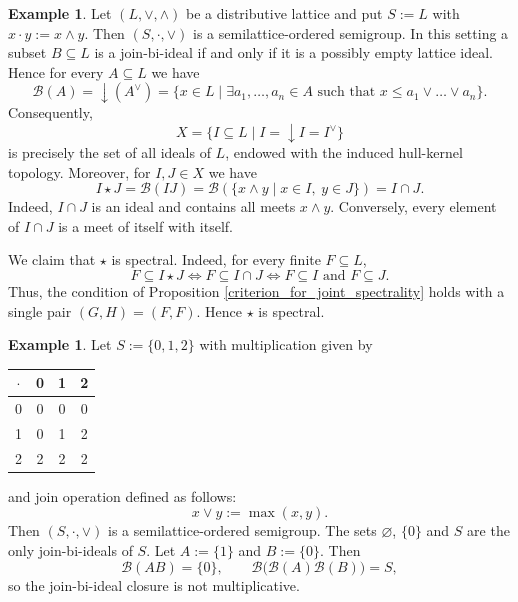 \documentclass[10pt, reqno]{amsart}
\theoremstyle{plain}
\theoremstyle{definition}
\newtheorem{example}[theorem]{Example}
\begin{document}
\begin{example}
    Let $(L, \lor, \land)$ be a distributive lattice and put $S := L$ with $x \cdot y := x \land y$. Then $(S, \cdot, \lor)$ is a semilattice-ordered semigroup. In this setting a subset $B \subseteq L$ is a join-bi-ideal if and only if it is a possibly empty lattice ideal. Hence for every $A \subseteq L$ we have
    \begin{equation*}
        \mathcal{B}(A) = \downarrow(A^\lor) = \{x \in L \mid \exists a_1, \ldots, a_n \in A \text{ such that } x \leqslant a_1 \lor \ldots \lor a_n\}.
    \end{equation*}
    Consequently, 
    \begin{equation*}
        X = \{I \subseteq L \mid I = \downarrow I = I^\lor\}  
    \end{equation*}
    is precisely the set of all ideals of $L$, endowed with the induced hull-kernel topology. Moreover, for $I, J \in X$ we have 
    \begin{equation*}
        I \star J = \mathcal{B}(IJ) = \mathcal{B}(\{x \land y \mid x \in I,\hspace{3pt} y \in J\}) = I \cap J. 
    \end{equation*}
    Indeed, $I \cap J$ is an ideal and contains all meets $x \land y$. Conversely, every element of $I \cap J$ is a meet of itself with itself. 
    
    We claim that $\star$ is spectral. Indeed, for every finite $F \subseteq L$, 
    \begin{equation*}
        F \subseteq I \star J \iff F \subseteq I \cap J \iff F \subseteq I \text{ and } F \subseteq J. 
    \end{equation*}
    Thus, the condition of Proposition \ref{criterion_for_joint_spectrality} holds with a single pair $(G, H) = (F, F)$. Hence $\star$ is spectral. 
\end{example}
\begin{example}\label{join_bi_ideal_closure_is_not_multiplicative}
    Let $S := \{0,1,2\}$ with multiplication given by 
    \begin{table}[H]
        \centering
            \begin{tabular}{c|ccc}
                $\cdot$ & 0 & 1 & 2 \\ \hline
                0 & 0 & 0 & 0 \\
                1 & 0 & 1 & 2 \\
                2 & 2 & 2 & 2 
            \end{tabular}
    \end{table}
    and join operation defined as follows: $$x\lor y := \max(x,y).$$ Then $(S, \cdot, \lor)$ is a semilattice-ordered semigroup. The sets $\varnothing$, $\{0\}$ and $S$ are the only join-bi-ideals of $S$. Let $A := \{1\}$ and $B := \{0\}$. Then $$\mathcal{B}(AB) = \{0\}, \qquad \mathcal{B}\big(\mathcal{B}(A)\mathcal{B}(B)\big) = S,$$ so the join-bi-ideal closure is not multiplicative. 
\end{example}
\end{document}
